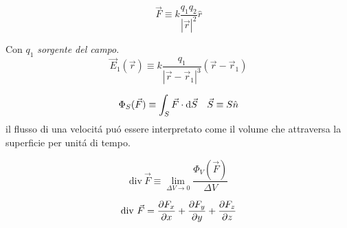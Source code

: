\begin{multicols}{3}
  \begin{equation}
    \vec{F} \equiv k \frac{q_1q_2}{|\vec{r}|^2}\hat{r}
  \end{equation}

  Con $q_1$ \textit{sorgente del campo}.
  \begin{equation}
    \vec{E}_1(\vec{r}) \equiv k \frac{q_1}{|\vec{r} - \vec{r}_1|^3}(\vec{r} - \vec{r}_1)
  \end{equation}
  
  \begin{equation}
    \Phi_S(\vec{F}) \equiv \int_S \vec{F} \cdot \text{d}\vec{S} \quad \vec{S} \equiv S\hat{n} \\
  \end{equation}
  il flusso di una velocit\'a pu\'o essere interpretato come il volume che attraversa la superficie per unit\'a di tempo.

  \begin{equation}
    \text{div}~\vec{F} \equiv \lim_{\Delta V \to 0} \frac{\Phi_V(\vec{F})}{\Delta V}
  \end{equation}
  
  \begin{equation}
    \text{div}~\vec{F} = \pdv{F_x}{x} + \pdv{F_y}{y} + \pdv{F_z}{z}
  \end{equation}


\end{multicols}


